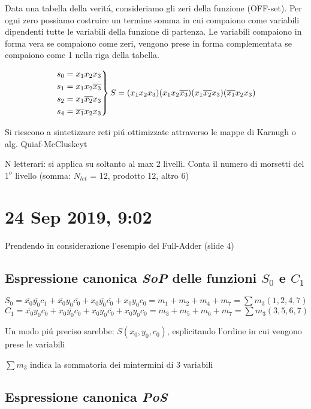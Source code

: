 \documentclass{article}
\begin{document}
Data una tabella della verit\'a, consideriamo gli zeri della funzione (OFF-set). Per ogni zero possiamo costruire un termine somma in cui compaiono come variabili dipendenti tutte le variabili della funzione di partenza.
Le variabili compaiono in forma vera se compaiono come zeri, vengono prese in forma complementata se compaiono come 1 nella riga della tabella.

\[
    \begin{rcases}
        s_0 = x_1 x_2 x_3\\
        s_1 = x_1 x_2 \overline{x_3}\\
        s_2 = x_1 \overline{x_2} x_3\\
        s_4 = \overline{x_1} x_2 x_3
    \end{rcases}
    S =  (x_1 x_2 x_3)(x_1 x_2 \overline{x_3})(x_1 \overline{x_2} x_3)(\overline{x_1} x_2 x_3)
\]

Si riescono a sintetizzare reti pi\'u ottimizzate attraverso le mappe di Karnugh o alg. Quiaf-McCluskeyt

N letterari: si applica su soltanto al max 2 livelli. Conta il numero di morsetti del $1^o$ livello (somma: $N_{let}$ = 12, prodotto 12, altro 6)

\newpage
\section{24 Sep 2019,  9:02}
Prendendo in considerazione l'esempio del Full-Adder (slide 4)
\subsection{Espressione canonica \textit{SoP} delle funzioni $S_0$ e $C_1$}
$S_0 = \overline{x_0} \overline{y_0} c_1 + \overline{x_0} y_0 \overline{c_0} + x_0 \overline{y_0} \overline{c_0} + x_0 y_0 c_0 = m_1 + m_2 + m_4 + m_7 = \sum m_3(1, 2, 4, 7)$\\
$C_1 = \overline{x_0} y_0 c_0 + x_0 \overline{y_0} c_0 + x_0 y_0 \overline{c_0} + x_0 y_0 c_0 = m_3 + m_5 + m_6 + m_7 = \sum m_3(3, 5, 6, 7)$

Un modo pi\'u preciso sarebbe: $S(x_0, y_0, c_0) $, esplicitando l'ordine in cui vengono prese le variabili

$\sum m_3$ indica la sommatoria dei mintermini di 3 variabili


\subsection{Espressione canonica \textit{PoS}}
\end{document}
